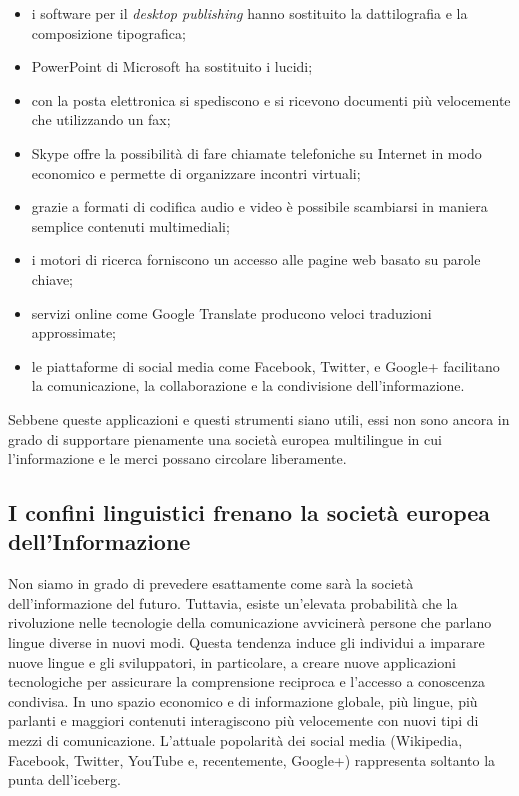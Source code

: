 \documentclass[]{../../metanetpaper}
\begin{document}
\begin{multicols}{2}
\begin{itemize}
\item i software per il \emph{desktop publishing} hanno sostituito la
  dattilografia e la composizione tipografica;
\item PowerPoint di Microsoft ha sostituito i lucidi;
\item con la posta elettronica si spediscono e si ricevono documenti pi\`{u}
  velocemente che utilizzando un fax;
\item Skype offre la possibilit\`{a} di fare chiamate telefoniche su Internet in
  modo economico e permette di organizzare incontri virtuali;
\item grazie a formati di codifica audio e video \`{e} possibile scambiarsi in
  maniera semplice contenuti multimediali;
\item i motori di ricerca forniscono un accesso alle pagine web basato su parole
  chiave;
\item servizi online come Google Translate producono veloci traduzioni
  approssimate;
\item le piattaforme di social media come Facebook, Twitter, e Google+ facilitano
  la comunicazione, la collaborazione e la condivisione dell'informazione.
\end{itemize}

Sebbene queste applicazioni e questi strumenti siano utili, essi non sono
ancora in grado di supportare pienamente una societ\`{a} europea multilingue
in cui l'informazione e le merci possano circolare liberamente.

\subsection{I confini linguistici frenano la societ\`{a} europea dell'Informazione}

Non siamo in grado di prevedere esattamente come sar\`{a} la societ\`{a} dell'informazione del futuro. Tuttavia, esiste un'elevata probabilit\`{a} che la rivoluzione nelle tecnologie della comunicazione avviciner\`{a} persone che parlano lingue diverse in nuovi modi. Questa tendenza induce gli individui a imparare nuove lingue e gli sviluppatori, in particolare, a creare nuove applicazioni tecnologiche per assicurare la comprensione reciproca e l'accesso a conoscenza condivisa. In uno spazio economico e di informazione globale, pi\`{u} lingue, pi\`{u} parlanti e maggiori contenuti interagiscono pi\`{u} velocemente con nuovi tipi di mezzi di comunicazione. L'attuale popolarit\`{a} dei social media (Wikipedia, Facebook, Twitter, YouTube e, recentemente, Google+) rappresenta soltanto la punta dell'iceberg.


\end{multicols}
\end{document}
